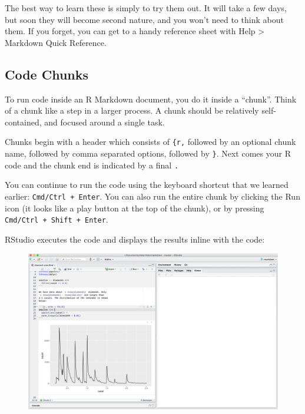 \documentclass[]{book}
\begin{document}
The best way to learn these is simply to try them out. It will take a
few days, but soon they will become second nature, and you won't need to
think about them. If you forget, you can get to a handy reference sheet
with Help \textgreater{} Markdown Quick Reference.

\subsection{Code Chunks}\label{code-chunks}

To run code inside an R Markdown document, you do it inside a ``chunk''.
Think of a chunk like a step in a larger process. A chunk should be
relatively self-contained, and focused around a single task.

Chunks begin with a header which consists of
\texttt{\textasciigrave{}\textasciigrave{}\textasciigrave{}\{r,}
followed by an optional chunk name, followed by comma separated options,
followed by \texttt{\}}. Next comes your R code and the chunk end is
indicated by a final
\texttt{\textasciigrave{}\textasciigrave{}\textasciigrave{}.}

You can continue to run the code using the keyboard shortcut that we
learned earlier: \texttt{Cmd/Ctrl\ +\ Enter}. You can also run the
entire chunk by clicking the Run icon (it looks like a play button at
the top of the chunk), or by pressing
\texttt{Cmd/Ctrl\ +\ Shift\ +\ Enter}.

RStudio executes the code and displays the results inline with the code:

\begin{figure}
\centering
\includegraphics{img/r-markdown.png}
\caption{}
\end{figure}
\end{document}
